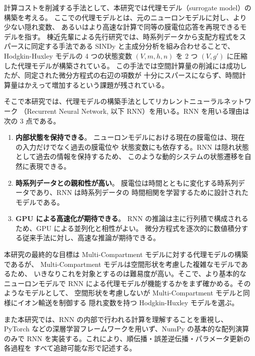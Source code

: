 \documentclass[a4paper,11pt,openany]{ltjsreport}
\begin{document}
計算コストを削減する手法として、本研究では代理モデル（surrogate model）の構築を考える。
ここでの代理モデルとは、元のニューロンモデルに対し、より少ない隠れ変数、
あるいはより高速な計算で同等の膜電位応答を再現できるモデルを指す。
棟近先輩による先行研究では、時系列データから支配方程式をスパースに同定する手法である
SINDy\cite{brunton2015} と主成分分析を組み合わせることで、
Hodgkin-Huxley モデル\cite{hodgkin1952}の 4 つの状態変数
$(V, m, h, n)$ を 2 つ $(V, g')$ に圧縮した代理モデルが構築されている\cite{munechika2025}。
この手法では空間計算量の削減には成功したが、同定された微分方程式の右辺の項数が
十分にスパースにならず、時間計算量はかえって増加するという課題が残されている。

そこで本研究では、代理モデルの構築手法としてリカレントニューラルネットワーク
（Recurrent Neural Network, 以下 RNN）を用いる。RNN を用いる理由は次の 3 点である。

\begin{enumerate}[label=(\arabic*)]
  \item \textbf{内部状態を保持できる}。
        ニューロンモデルにおける現在の膜電位は、現在の入力だけでなく過去の膜電位や
        状態変数にも依存する。RNN は隠れ状態として過去の情報を保持するため、
        このような動的システムの状態遷移を自然に表現できる。
  \item \textbf{時系列データとの親和性が高い}。
        膜電位は時間とともに変化する時系列データであり、RNN は時系列データの
        時間相関を学習するために設計されたモデルである。
  \item \textbf{GPU による高速化が期待できる}。
        RNN の推論は主に行列積で構成されるため、GPU による並列化と相性がよい。
        微分方程式を逐次的に数値積分する従来手法に対し、高速な推論が期待できる。
\end{enumerate}

本研究の最終的な目標は Multi-Compartment モデルに対する代理モデルの構築であるが、
Multi-Compartment モデルは空間形状を考慮した複雑なモデルであるため、
いきなりこれを対象とするのは難易度が高い。そこで、より基本的なニューロンモデルで
RNN による代理モデルが機能するかをまず確かめる。そのようなモデルとして、
空間形状を考慮しないが Multi-Compartment モデルと同様にイオン輸送を制御する
隠れ変数を持つ Hodgkin-Huxley モデルを選ぶ\cite{hodgkin1952}。

また本研究では、RNN の内部で行われる計算を理解することを重視し、
PyTorch などの深層学習フレームワークを用いず、NumPy の基本的な配列演算のみで
RNN を実装する。これにより、順伝播・誤差逆伝播・パラメータ更新の各過程を
すべて追跡可能な形で記述する。
\end{document}
